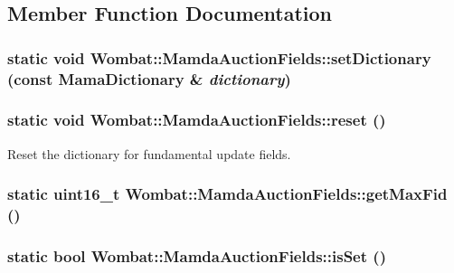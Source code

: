 \subsection{Member Function Documentation}
\hypertarget{classWombat_1_1MamdaAuctionFields_04a03b13472ac525489f320e7dabf968}{
\subsubsection[setDictionary]{\setlength{\rightskip}{0pt plus 5cm}static void Wombat::Mamda\-Auction\-Fields::set\-Dictionary (const Mama\-Dictionary \& {\em dictionary})}}
\label{classWombat_1_1MamdaAuctionFields_04a03b13472ac525489f320e7dabf968}


\hypertarget{classWombat_1_1MamdaAuctionFields_86e3c690a626fe8c088262db658b1b11}{
\subsubsection[reset]{\setlength{\rightskip}{0pt plus 5cm}static void Wombat::Mamda\-Auction\-Fields::reset ()}}
\label{classWombat_1_1MamdaAuctionFields_86e3c690a626fe8c088262db658b1b11}


Reset the dictionary for fundamental update fields. 

\hypertarget{classWombat_1_1MamdaAuctionFields_9a63f2491edf111a4930991c0c6ce068}{
\subsubsection[getMaxFid]{\setlength{\rightskip}{0pt plus 5cm}static uint16\_\-t Wombat::Mamda\-Auction\-Fields::get\-Max\-Fid ()}}
\label{classWombat_1_1MamdaAuctionFields_9a63f2491edf111a4930991c0c6ce068}


\hypertarget{classWombat_1_1MamdaAuctionFields_5f110997c1c2c8a6a0c207cac660f0e3}{
\subsubsection[isSet]{\setlength{\rightskip}{0pt plus 5cm}static bool Wombat::Mamda\-Auction\-Fields::is\-Set ()}}
\label{classWombat_1_1MamdaAuctionFields_5f110997c1c2c8a6a0c207cac660f0e3}




